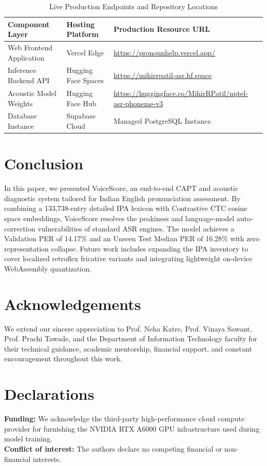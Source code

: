 \documentclass[11pt,a4paper]{article}
\begin{document}
\begin{table}[h]
    \centering
    \caption{Live Production Endpoints and Repository Locations}\label{tab:live_endpoints}
    \vspace{0.5em}
    \begin{tabular}{p{4.2cm} p{3.8cm} p{6.5cm}}
        \toprule
        \textbf{Component Layer} & \textbf{Hosting Platform} & \textbf{Production Resource URL} \\
        \midrule
        Web Frontend Application & Vercel Edge & \url{https://pronounhelp.vercel.app/} \\
        Inference Backend API & Hugging Face Spaces & \url{https://mihirrpatil-asr.hf.space} \\
        Acoustic Model Weights & Hugging Face Hub & \url{https://huggingface.co/MihirRPatil/nptel-asr-phoneme-v3} \\
        Database Instance & Supabase Cloud & Managed PostgreSQL Instance \\
        \bottomrule
    \end{tabular}
\end{table}

\section{Conclusion}\label{sec8}
In this paper, we presented VoiceScore, an end-to-end CAPT and acoustic diagnostic system tailored for Indian English pronunciation assessment. By combining a 133,738-entry detailed IPA lexicon with Contrastive CTC cosine space embeddings, VoiceScore resolves the peakiness and language-model auto-correction vulnerabilities of standard ASR engines. The model achieves a Validation PER of 14.17\% and an Unseen Test Median PER of 16.28\% with zero representation collapse. Future work includes expanding the IPA inventory to cover localized retroflex fricative variants and integrating lightweight on-device WebAssembly quantization.

\section*{Acknowledgements}
We extend our sincere appreciation to Prof. Neha Katre, Prof. Vinaya Sawant, Prof. Prachi Tawade, and the Department of Information Technology faculty for their technical guidance, academic mentorship, financial support, and constant encouragement throughout this work.

\section*{Declarations}
\textbf{Funding:} We acknowledge the third-party high-performance cloud compute provider for furnishing the NVIDIA RTX A6000 GPU infrastructure used during model training.\\
\textbf{Conflict of interest:} The authors declare no competing financial or non-financial interests.



\end{document}
